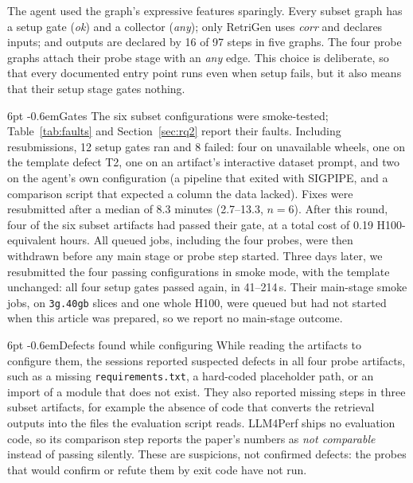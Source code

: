 \documentclass[pdflatex,sn-mathphys-num]{sn-jnl}
\makeatletter
\theoremstyle{thmstyletwo}%
\theoremstyle{thmstylethree}%
\newcommand{\code}[1]{\texttt{#1}}
\renewcommand\paragraph{\@startsection{paragraph}{4}{\z@}%
  {6pt \@plus 2pt \@minus 1pt}{-0.6em}{\normalfont\normalsize\bfseries}}
\makeatother
\begin{document}
The agent used the graph's expressive features sparingly. Every subset graph has a setup gate (\emph{ok}) and a collector (\emph{any}); only RetriGen uses \emph{corr} and declares inputs; and outputs are declared by 16 of 97 steps in five graphs. The four probe graphs attach their probe stage with an \emph{any} edge. This choice is deliberate, so that every documented entry point runs even when setup fails, but it also means that their setup stage gates nothing.

\paragraph{Gates} The six subset configurations were smoke-tested; Table~\ref{tab:faults} and Section~\ref{sec:rq2} report their faults. Including resubmissions, 12 setup gates ran and 8 failed: four on unavailable wheels, one on the template defect T2, one on an artifact's interactive dataset prompt, and two on the agent's own configuration (a pipeline that exited with SIGPIPE, and a comparison script that expected a column the data lacked). Fixes were resubmitted after a median of 8.3 minutes (2.7--13.3, $n=6$). After this round, four of the six subset artifacts had passed their gate, at a total cost of 0.19 H100-equivalent hours. All queued jobs, including the four probes, were then withdrawn before any main stage or probe step started. Three days later, we resubmitted the four passing configurations in smoke mode, with the template unchanged: all four setup gates passed again, in 41--214\,s. Their main-stage smoke jobs, on \code{3g.40gb} slices and one whole H100, were queued but had not started when this article was prepared, so we report no main-stage outcome.

\paragraph{Defects found while configuring} While reading the artifacts to configure them, the sessions reported suspected defects in all four probe artifacts, such as a missing \code{requirements.txt}, a hard-coded placeholder path, or an import of a module that does not exist. They also reported missing steps in three subset artifacts, for example the absence of code that converts the retrieval outputs into the files the evaluation script reads. LLM4Perf ships no evaluation code, so its comparison step reports the paper's numbers as \emph{not comparable} instead of passing silently. These are suspicions, not confirmed defects: the probes that would confirm or refute them by exit code have not run.
\end{document}
